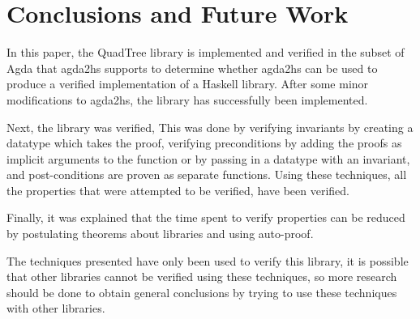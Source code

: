 \section{Conclusions and Future Work}
In this paper, the QuadTree library is implemented and verified in the subset of Agda that agda2hs supports to determine whether agda2hs can be used to produce a verified implementation of a Haskell library. After some minor modifications to agda2hs, the library has successfully been implemented. 

Next, the library was verified, This was done by verifying invariants by creating a datatype which takes the proof, verifying preconditions by adding the proofs as implicit arguments to the function or by passing in a datatype with an invariant, and post-conditions are proven as separate functions.  Using these techniques, all the properties that were attempted to be verified, have been verified. 

Finally, it was explained that the time spent to verify properties can be reduced by postulating theorems about libraries and using auto-proof. 

The techniques presented have only been used to verify this library, it is possible that other libraries cannot be verified using these techniques, so more research should be done to obtain general conclusions by trying to use these techniques with other libraries. 